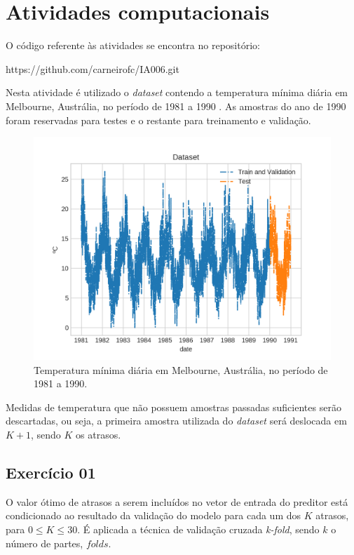 \documentclass{article}
\begin{document}
    \section[]{Atividades computacionais}
    O código referente às atividades se encontra no repositório:
    
    https://github.com/carneirofc/IA006.git\linebreak

    Nesta atividade é utilizado o \textit{dataset} contendo a temperatura mínima
    diária em Melbourne, Austrália, no período de 1981 a 1990 . As amostras do ano
    de 1990 foram reservadas para testes e o restante para treinamento e validação.
    \begin{figure}[H]
        \centering
        \includegraphics[width=\linewidth]{ex01/dataset.png}
        \caption{Temperatura mínima diária em Melbourne, Austrália, no período de 1981 a 1990.}
        \label{fig:dataset}
    \end{figure}
    
    Medidas de temperatura que não possuem amostras passadas suficientes serão descartadas, ou seja,
    a primeira amostra utilizada do \textit{dataset} será deslocada em $K + 1$, sendo $K$ os atrasos.
    \subsection[]{Exercício 01}
    O valor ótimo de atrasos a serem incluídos no vetor de entrada do preditor está condicionado
    ao resultado da validação do modelo para cada um dos $K$ atrasos, para $0\leqslant K \leqslant  30$.
    É aplicada a técnica de validação cruzada \textit{k-fold}, sendo $k$ o número de partes, $folds$.
\end{document}
